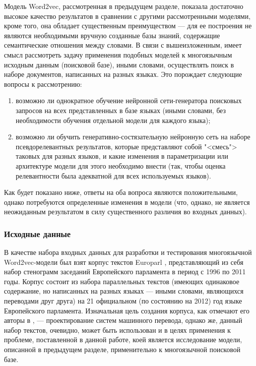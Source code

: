 Модель Word2vec, рассмотренная в предыдущем разделе, показала достаточно высокое качество результатов в сравнении с другими рассмотренными моделями,
кроме того, она обладает существенным преимуществом --- для ее построения не являются необходимыми вручную созданные базы знаний, содержащие семантические
отношения между словами. В связи с вышеизложенным, имеет смысл рассмотреть задачу применения подобных моделей к многоязычным исходным данным (поисковой базе),
иными словами, осуществлять поиск в наборе документов, написанных на разных языках. Это порождает следующие вопросы к рассмотрению:

\begin{enumerate}[1)]
    \item возможно ли однократное обучение нейронной сети-генератора поисковых запросов на всех представленных в базе языках (иными словами, без
          необходимости обучения отдельной модели для каждого языка);
    \item возможно ли обучить генеративно-состязательную нейронную сеть на наборе псевдорелевантных результатов, которые представляют собой "<смесь"> таковых
          для разных языков, и какие изменения в параметризации или архитектуре модели для этого необходимо внести (так, чтобы оценка релевантности была
          адекватной для всех используемых языков).
\end{enumerate}

Как будет показано ниже, ответы на оба вопроса являются положительными, однако потребуются определенные изменения в модели (что, однако, не является 
неожиданным результатом в силу существенного различия во входных данных).

\subsubsection{Исходные данные}
В качестве набора входных данных для разработки и тестирования многоязычной Word2vec-модели был взят корпус текстов Europarl \cite{Koehn2005EuroparlAP},
представляющий из себя набор стенограмм заседаний Европейского парламента в период с 1996 по 2011 годы. Корпус состоит из набора параллельных текстов 
(имеющих одинаковое содержание, но написанных на разных языках --- иными словами, являющихся переводами друг друга) на 21 официальном (по состоянию на 2012) 
год языке Европейского парламента. Изначальная цель создания корпуса, как отмечают его авторы в \cite{Koehn2005EuroparlAP}, --- проектирование систем машинного
перевода, однако же, данный набор текстов, очевидно, может быть использован и в целях применения к проблеме, поставленной в данной работе, коей является
исследование модели, описанной в предыдущем разделе, применительно к многоязычной поисковой базе.

